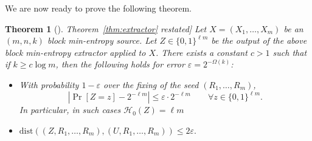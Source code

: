 \documentclass[11pt]{article}
\numberwithin{equation}{section}
\newtheorem{theorem}{Theorem}[section]
\theoremstyle{definition}
\theoremstyle{plain}
\newcommand{\expref}[2]{\hyperref[#2]{#1~\ref{#2}}}
\def\dist{\mathrm{dist}}
\def\entropy{\mathcal{H}}
\newcommand{\eps}{\varepsilon}
\begin{document}
We are now ready to prove the following theorem.

%
%
\begin{theorem}[\expref{Theorem}{thm:extractor} restated]
Let $X=(X_1, \ldots, X_m)$ be an $(m,n,k)$ block min-entropy source. Let $Z \in \{0,1\}^{\ell m}$ be the
output of the above block min-entropy extractor applied to $X$. There exists a constant $c>1$ such that if $k \geq c \log m$, then the following
holds for error $\eps=2^{-\Omega(k)}$:

\begin{itemize}
\item With probability $1-\eps$ over the fixing of the seed $(R_1, \dots, R_m)$,
$$\left|\Pr[Z=z]-2^{-\ell m}\right| \leq \eps \cdot 2^{-\ell m} \qquad \forall z \in \{0,1\}^{\ell m}.$$
In particular, in such cases $\entropy_{0}(Z) = \ell m$
\item $\dist\left((Z, R_1, \ldots, R_m),(U, R_1, \ldots, R_m)\right) \leq 2\eps.$
\end{itemize} %
\end{theorem}   %
\end{document}
